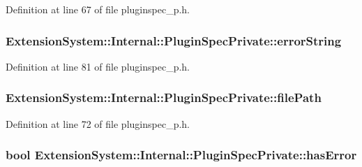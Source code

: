 Definition at line 67 of file pluginspec\-\_\-p.\-h.

\hypertarget{class_extension_system_1_1_internal_1_1_plugin_spec_private_a1fdbeffffeb8b7a7dbb2d30417674d83}{
\subsubsection[{error\-String}]{ Extension\-System\-::\-Internal\-::\-Plugin\-Spec\-Private\-::error\-String}}\label{class_extension_system_1_1_internal_1_1_plugin_spec_private_a1fdbeffffeb8b7a7dbb2d30417674d83}


Definition at line 81 of file pluginspec\-\_\-p.\-h.

\hypertarget{class_extension_system_1_1_internal_1_1_plugin_spec_private_a048e4d091eccd93affd5c38b841ad2ed}{
\subsubsection[{file\-Path}]{ Extension\-System\-::\-Internal\-::\-Plugin\-Spec\-Private\-::file\-Path}}\label{class_extension_system_1_1_internal_1_1_plugin_spec_private_a048e4d091eccd93affd5c38b841ad2ed}


Definition at line 72 of file pluginspec\-\_\-p.\-h.

\hypertarget{class_extension_system_1_1_internal_1_1_plugin_spec_private_aaee87e26d32c27c408a5059bd821b217}{
\subsubsection[{has\-Error}]{\setlength{\rightskip}{0pt plus 5cm}bool Extension\-System\-::\-Internal\-::\-Plugin\-Spec\-Private\-::has\-Error}}\label{class_extension_system_1_1_internal_1_1_plugin_spec_private_aaee87e26d32c27c408a5059bd821b217}


